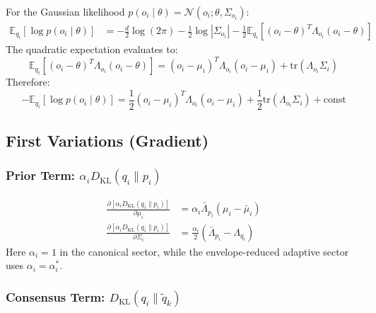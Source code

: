 \documentclass[12pt]{article}
\begin{document}
For the Gaussian likelihood $p(o_i \mid \theta) = \mathcal{N}(o_i; \theta, \Sigma_{o_i})$:
%
\begin{align}
\mathbb{E}_{q_i}[\log p(o_i \mid \theta)] &= -\frac{d}{2}\log(2\pi) - \frac{1}{2}\log|\Sigma_{o_i}| - \frac{1}{2}\mathbb{E}_{q_i}\left[(o_i - \theta)^T\Lambda_{o_i}(o_i - \theta)\right]
\end{align}
%
The quadratic expectation evaluates to:
%
\begin{equation}
\mathbb{E}_{q_i}\left[(o_i - \theta)^T\Lambda_{o_i}(o_i - \theta)\right] = (o_i - \mu_i)^T\Lambda_{o_i}(o_i - \mu_i) + \mathrm{tr}(\Lambda_{o_i}\Sigma_i)
\end{equation}
%
Therefore:
%
\begin{equation}
\boxed{
-\mathbb{E}_{q_i}[\log p(o_i \mid \theta)] = \frac{1}{2}(o_i - \mu_i)^T\Lambda_{o_i}(o_i - \mu_i) + \frac{1}{2}\mathrm{tr}(\Lambda_{o_i}\Sigma_i) + \mathrm{const}
}
\label{eq:neg_log_likelihood}
\end{equation}

\subsection{First Variations (Gradient)}

\subsubsection{Prior Term: $\alpha_iD_{\mathrm{KL}}(q_i \| p_i)$}

\begin{align}
\frac{\partial [\alpha_iD_{\mathrm{KL}}(q_i \| p_i)]}{\partial \mu_i} &= \alpha_i\bar{\Lambda}_{p_i}(\mu_i - \bar{\mu}_i) \label{eq:grad_prior_mu} \\[6pt]
\frac{\partial [\alpha_iD_{\mathrm{KL}}(q_i \| p_i)]}{\partial \Sigma_i} &= \frac{\alpha_i}{2}(\bar{\Lambda}_{p_i} - \Lambda_{q_i}) \label{eq:grad_prior_sigma}
\end{align}
Here $\alpha_i=1$ in the canonical sector, while the envelope-reduced adaptive sector uses $\alpha_i=\alpha_i^*$.

\subsubsection{Consensus Term: $D_{\mathrm{KL}}(q_i \| \tilde{q}_k)$}
\end{document}
